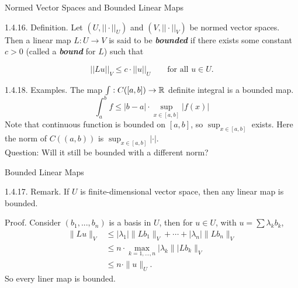 \documentclass[hyperref={pdfpagelabels=true}]{beamer}
\newcommand{\highlightg}[1]{\textcolor[rgb]{0.1,0.5,0.3}{\emph{\textbf{#1}}}}
\newcommand{\structb}[1]{\textcolor[rgb]{0.2,0.2,0.7}{#1}}
\newcommand{\<}{\langle}
\renewcommand{\>}{\rangle}
\begin{document}
\begin{frame}{Normed Vector Spaces and Bounded Linear Maps}
    \begin{block}{1.4.16. Definition.}
        Let $(U,||\cdot||_{U})$ and $(V,||\cdot||_{V})$ be normed vector spaces. Then a linear map $L:U \rightarrow V$ is said to be \highlightg{bounded} if there exists some constant $c > 0$ (called a \highlightg{bound} for $L$) such that
        \begin{spacing}{0.7} 
        \[||Lu||_{V} \leq c \cdot ||u||_{U}\qquad \text{for all }u \in U.\]
        \end{spacing}
    \end{block}
    \begin{block}{1.4.18. Examples.}
        The map $\int:C([a,b])\rightarrow \mathbb{R}$ definite integral is a bounded map.
        \[\int_{a}^{b}f \leq |b-a| \cdot \sup_{x \in [a,b]}|f(x)|\]
        Note that continuous function is bounded on $[a,b]$, so $\sup_{x \in [a,b]}$ exists. Here the norm of $C((a,b))$ is $\sup_{x \in [a,b]}|\cdot|$.\\
        \structb{Question:}
        Will it still be bounded with a different norm?
    \end{block}
\end{frame}
\begin{frame}{Bounded Linear Maps}
    \begin{block}{1.4.17. Remark.}
        If $U$ is finite-dimensional vector space, then any linear map is bounded.
    \end{block}
    \begin{block}{Proof.}
        Consider $(b_{1},...,b_{n})$ is a basis in $U$, then for $u \in U$, with $u = \sum \lambda_{k}b_{k}$,
        \[
            \begin{aligned}
                \|Lu\|_{V} &\leq |\lambda_{1}|\|Lb_{1}\|_{V}+\cdots+|\lambda_{n}|\|Lb_{n}\|_{V}\\
                &\leq n \cdot \max_{k = 1,...,n}|\lambda_{k}\||Lb_{k}\|_{V}\\
                &\leq n \cdot \|u\|_{U}.
            \end{aligned}
        \]
        So every liner map is bounded.
    \end{block}       
\end{frame}
\end{document}
